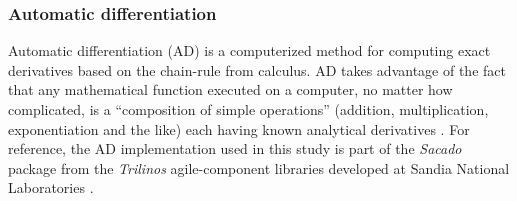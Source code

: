 \documentclass[preprint,12pt]{elsarticle}
\begin{document}
\subsubsection{Automatic differentiation} 
\label{ADsubsection}

Automatic differentiation (AD) is a computerized method for computing exact
derivatives based on the chain-rule from calculus. AD takes advantage of the fact
that any mathematical function executed on a computer, no matter how
complicated, is a ``composition of simple operations'' (addition, multiplication, exponentiation and the like) each having known analytical derivatives
\cite{ref-sacado-presentation}. For reference, the AD implementation used in
this study is part of the \emph{Sacado} package from the \emph{Trilinos}
agile-component libraries developed at Sandia National Laboratories
\cite{ref-Sacado}.
\end{document}
